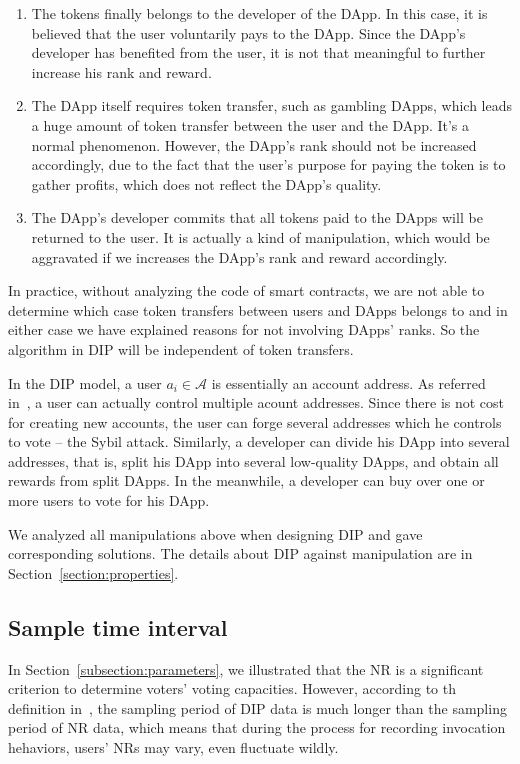   \begin{enumerate}
  	 \item The tokens finally belongs to the developer of the DApp. In this case, it is believed that the user voluntarily pays to the DApp. Since the DApp's developer has benefited from the user, it is not that meaningful to further increase his rank and reward.
  	\item The DApp itself requires token transfer, such as gambling DApps, which leads  a huge amount of token transfer between the user and the DApp. It's a normal phenomenon. However, the DApp's rank should not be increased accordingly, due to the fact that the user's purpose for paying the token is to gather profits, which does not reflect the DApp's quality.
   \item The DApp's developer commits that all tokens paid to the DApps will be returned to the user. It is actually a kind of manipulation, which would be aggravated if we increases the DApp's rank and reward accordingly.
  \end{enumerate}
  In practice, without analyzing the code of smart contracts, we are not able to determine which case token transfers between users and DApps belongs to and in either case we have explained reasons for not involving DApps' ranks. So the algorithm in DIP will be independent of token transfers.

  In the DIP model, a user $a_i \in \mathcal{A}$ is essentially an account address. As referred in~\cite{Nebulasyellowpaper}, a user can actually control multiple acount addresses. Since there is not cost for creating new accounts, the user can forge several addresses which he controls to vote -- the Sybil attack. Similarly, a developer can divide his DApp into several addresses, that is, split his DApp into several low-quality DApps, and obtain all rewards from split DApps. In the meanwhile, a developer can buy over one or more users to vote for his DApp.

  We analyzed all manipulations above when designing DIP and gave corresponding solutions. The details about DIP against manipulation are in Section~\ref{section:properties}.

  \subsection{Sample time interval}
  \label{subsection:interval}
  In Section~\ref{subsection:parameters}, we illustrated that the NR is a significant criterion to determine voters' voting capacities. However, according to th definition in~\cite{Nebulasyellowpaper}, the sampling period of DIP data is much longer than the sampling period of NR data, which means that during the process for recording invocation hehaviors, users' NRs may vary, even fluctuate wildly.

